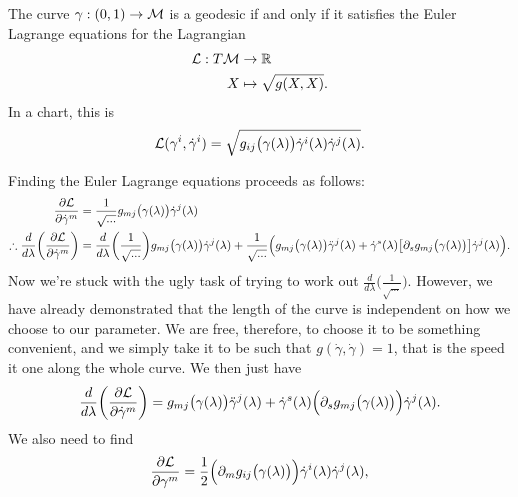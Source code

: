 \documentclass[12pt]{article} %
\begin{document}
\bt 
    The curve $\gamma:(0,1)\to\mathcal{M}$ is a geodesic if and only if it satisfies the Euler Lagrange equations for the Lagrangian \begin{align*}
        \begin{split}
            \mathcal{L} : T\mathcal{M} &\to \mathbb{R} \\
            X &\mapsto \sqrt{g(X,X)}.
        \end{split}
    \end{align*}
    In a chart, this is 
    \begin{align*}
        \mathcal{L}(\gamma^i,\Dot{\gamma}^i) = \sqrt{g_{ij}\big(\gamma(\lambda)\big)\Dot{\gamma}^i(\lambda)\Dot{\gamma}^j(\lambda)}.
    \end{align*}
\et 

Finding the Euler Lagrange equations proceeds as follows:
\begin{align*}
    \begin{split}
        \frac{\partial\mathcal{L}}{\partial\Dot{\gamma}^m} & = \frac{1}{\sqrt{...}} g_{mj}\big(\gamma(\lambda)\big) \Dot{\gamma}^j(\lambda) \\
        \therefore \frac{d}{d\lambda}\bigg(\frac{\partial\mathcal{L}}{\partial\Dot{\gamma}^m}\bigg) & = \frac{d}{d\lambda}\bigg(\frac{1}{\sqrt{...}}\bigg) g_{mj}\big(\gamma(\lambda)\big) \Dot{\gamma}^j(\lambda) + \frac{1}{\sqrt{...}} \Big( g_{mj}\big(\gamma(\lambda)\big) \Ddot{\gamma}^j(\lambda) + \Dot{\gamma}^s(\lambda)\big[\partial_s g_{mj}\big(\gamma(\lambda)\big)\big] \Dot{\gamma}^j(\lambda) \Big).
    \end{split}
\end{align*}
Now we're stuck with the ugly task of trying to work out $\frac{d}{d\lambda}\Big(\frac{1}{\sqrt{...}}\Big)$. However, we have already demonstrated that the length of the curve is independent on how we choose to our parameter. We are free, therefore, to choose it to be something convenient, and we simply take it to be such that $g(\Dot{\gamma},\Dot{\gamma})=1$, that is the speed it one along the whole curve. We then just have 
\begin{align*}
    \frac{d}{d\lambda}\bigg(\frac{\partial \mathcal{L}}{\partial \Dot{\gamma}^m}\bigg) = g_{mj}\big(\gamma(\lambda)\big) \Ddot{\gamma}^j(\lambda) + \Dot{\gamma}^s(\lambda)\Big(\partial_s g_{mj}\big(\gamma(\lambda)\big)\Big) \Dot{\gamma}^j(\lambda).
\end{align*}
We also need to find 
\begin{align*}
    \frac{\partial \mathcal{L}}{\partial \gamma^m} = \frac{1}{2} \Big(\partial_m g_{ij}\big(\gamma(\lambda)\big)\Big) \Dot{\gamma}^i(\lambda) \Dot{\gamma}^j(\lambda),
\end{align*}
\end{document}
